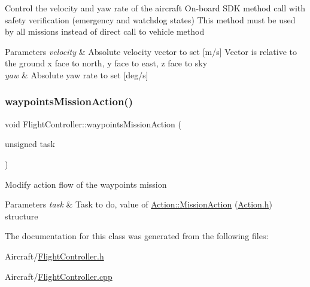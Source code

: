 Control the velocity and yaw rate of the aircraft On-\/board S\+DK method call with safety verification (emergency and watchdog states) This method must be used by all missions instead of direct call to vehicle method 
\begin{DoxyParams}{Parameters}
{\em velocity} & Absolute velocity vector to set \mbox{[}m/s\mbox{]} Vector is relative to the ground x face to north, y face to east, z face to sky \\
\hline
{\em yaw} & Absolute yaw rate to set \mbox{[}deg/s\mbox{]} \\
\hline
\end{DoxyParams}
\mbox{\label{class_m210_1_1_flight_controller_a81fc1a9c9495f93ffebab36d4d574ea9}} 
\subsubsection{\texorpdfstring{waypoints\+Mission\+Action()}{waypointsMissionAction()}}
{\footnotesize\ttfamily void Flight\+Controller\+::waypoints\+Mission\+Action (\begin{DoxyParamCaption}\item[{unsigned}]{task }\end{DoxyParamCaption})}

Modify action flow of the waypoints mission 
\begin{DoxyParams}{Parameters}
{\em task} & Task to do, value of \mbox{\hyperlink{class_m210_1_1_action_a0bb36f0932c930e1193428e3c3c98046}{Action\+::\+Mission\+Action}} (\mbox{\hyperlink{_action_8h}{Action.\+h}}) structure \\
\hline
\end{DoxyParams}


The documentation for this class was generated from the following files\+:\begin{DoxyCompactItemize}
\item 
Aircraft/\mbox{\hyperlink{_flight_controller_8h}{Flight\+Controller.\+h}}\item 
Aircraft/\mbox{\hyperlink{_flight_controller_8cpp}{Flight\+Controller.\+cpp}}\end{DoxyCompactItemize}
